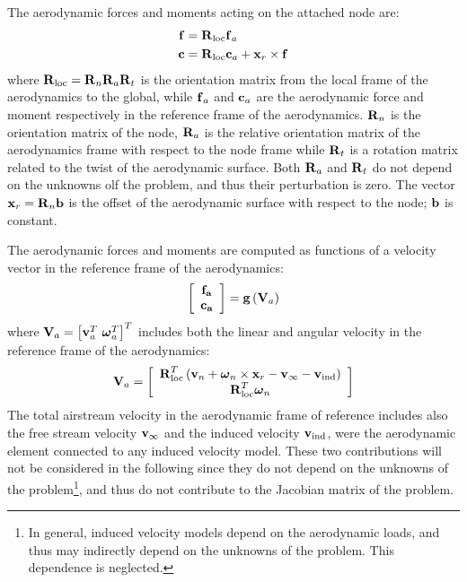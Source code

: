 The aerodynamic forces and moments acting on the attached node are:
\begin{subequations}
\begin{align}
	\T{f} &= \TT{R}_{\text{loc}} \T{f}_a\\ 
	\T{c} &= \TT{R}_{\text{loc}} \T{c}_a + \T{x}_r\times\T{f} 
\end{align}
\end{subequations}
where $\TT{R}_{\text{loc}} = \TT{R}_n\TT{R}_a\TT{R}_t$ is the orientation 
matrix from the local frame of the aerodynamics to the global, 
while $\T{f}_a$ and $\T{c}_a$ are the aerodynamic force and moment 
respectively in the reference frame of the aerodynamics. $\TT{R}_n$
is the orientation matrix of the node, $\TT{R}_a$ is the
relative orientation matrix of the aerodynamics frame with respect 
to the node frame while $\TT{R}_t$ is a rotation matrix 
related to the twist of the aerodynamic surface.
Both $\TT{R}_a$ and $\TT{R}_t$ do not depend on the unknowns
olf the problem, and thus their perturbation is zero.
The vector $\T{x}_r = \TT{R}_n\T{b}$ is the offset of the aerodynamic
surface with respect to the node; $\T{b}$ is constant.

The aerodynamic forces and moments are computed as functions 
of a velocity vector in the reference frame of the aerodynamics:
\begin{equation}
	\sqbr{\matr{c}{\T{f_a}\\\T{c_a}}} = \T{g}\plbr{\T{V}_{a}}
\end{equation}
where $\T{V}_{a} = \sqbr{\T{v}_a^T\ \T{\omega}_a^T}^T$ includes both the 
linear and angular velocity in the reference frame of the aerodynamics:
\begin{equation}
	\T{V}_{a} = \sqbr{\matr{c}{
		\TT{R}^T_{\text{loc}} \plbr{\T{v}_n + \T{\omega}_n\times\T{x}_r - \T{v}_{\infty} - \T{v}_{\text{ind}}}\\
		\TT{R}^T_{\text{loc}} \T{\omega}_n
		}}
\end{equation}
The total airstream velocity in the aerodynamic frame of reference 
includes also the free stream velocity $\T{v}_{\infty}$ and
the induced velocity $\T{v}_{\text{ind}}$, were the aerodynamic element
connected to any induced velocity model.
These two contributions will not be considered in the following
since they do not depend on the unknowns of the problem\footnote{In general,
induced velocity models depend on the aerodynamic loads,
and thus may indirectly depend on the unknowns of the problem.
This dependence is neglected.
}, and thus do not contribute to the Jacobian matrix of the problem. 

